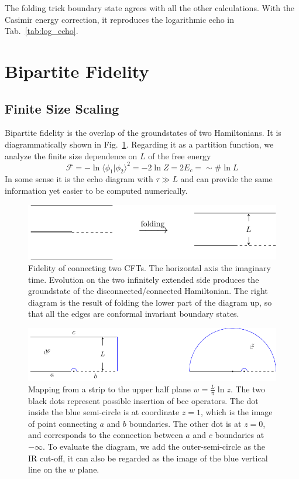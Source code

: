 \documentclass{article}
\begin{document}
The folding trick boundary state agrees with all the other calculations. With the Casimir energy correction, it reproduces the logarithmic echo in Tab.~\ref{tab:log_echo}. 



\section{Bipartite Fidelity}
\subsection{Finite Size Scaling}

Bipartite fidelity is the overlap of the groundstates of two Hamiltonians. It is diagrammatically shown in Fig.~\ref{fig:fidel}. Regarding it as a partition function, we analyze the finite size dependence on $L$ of the free energy
\begin{equation}
\mathcal{F} = - \ln \langle \phi_1 |\phi_2 \rangle^2 = - 2 \ln Z   = 2 E_c = \sim \# \ln L 
\end{equation}
In some sense it is the echo diagram with $\tau \gg L$ and can provide the same information yet easier to be computed numerically. 

\begin{figure}[h]
\centering
\includegraphics[width=	extwidth]{fig_fidel}\caption{Fidelity of connecting two CFTs. The horizontal axis the imaginary time. Evolution on the two infinitely extended side produces the groundstate of the disconnected/connected Hamiltonian. The right diagram is the result of folding the lower part of the diagram up, so that all the edges are conformal invariant boundary states.}
\label{fig:fidel}
\end{figure}

\begin{figure}[h]
\centering
\includegraphics[width=	extwidth]{fig_fidel-map}\caption{Mapping from a strip to the upper half plane $w = \frac{L}{\pi} \ln z $. The two black dots represent possible insertion of bcc operators. The dot inside the blue semi-circle is at coordinate $z = 1$, which is the image of point connecting $a$ and $b$ boundaries. The other dot is at $z = 0$, and corresponds to the connection between $a$ and $c$ boundaries at $- \infty$. To evaluate the diagram, we add the outer-semi-circle as the IR cut-off, it can also be regarded as the image of the blue vertical line on the $w$ plane.}
\label{fig:fidel-map}
\end{figure}
\end{document}

